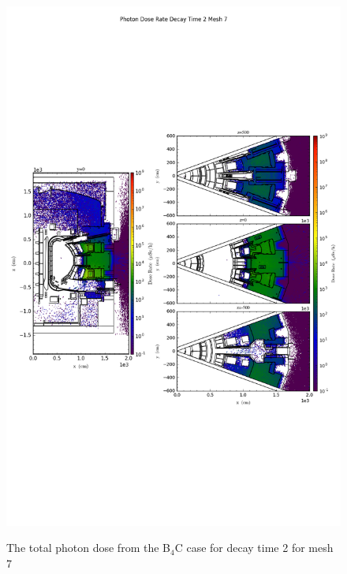 \begin{figure}[ht!]
\centering
\includegraphics[trim={0cm 9cm 0cm 10cm},clip,scale=0.75]{../plots/final_model_with_b4c/Photon_Dose_Rate_Decay_Time_2_Mesh_7.png}
\label{fig:photons_dc2_no4bc_m7_flux}
\caption{The total photon dose from the B$_4$C case for decay time 2 for mesh 7}
\end{figure}
